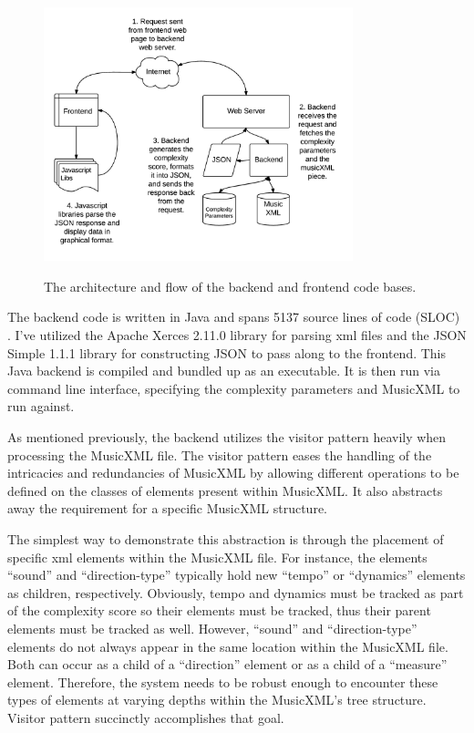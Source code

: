 \documentclass[12pt]{report}
\begin{document}
\begin{figure}[ht!]
	\centering
		\caption{The architecture and flow of the backend and frontend code bases.}
		\includegraphics[width=0.8\textwidth]{Architecture.png}
		\label{image:architecture}
\end{figure}

The backend code is written in Java \cite{java} and spans 5137 source lines of code (SLOC) \cite{nguyen2007sloc}. I've utilized the Apache Xerces 2.11.0 library for parsing xml files \cite{XMLAPI} and the JSON Simple 1.1.1 library \cite{JSONAPI} for constructing JSON \cite{crockford2006application} to pass along to the frontend. This Java backend is compiled and bundled up as an executable. It is then run via command line interface, specifying the complexity parameters and MusicXML to run against.

As mentioned previously, the backend utilizes the visitor pattern heavily when processing the MusicXML file. The visitor pattern eases the handling of the intricacies and redundancies of MusicXML by allowing different operations to be defined on the classes of elements present within MusicXML. It also abstracts away the requirement for a specific MusicXML structure.

The simplest way to demonstrate this abstraction is through the placement of specific xml elements within the MusicXML file. For instance, the elements ``sound'' and ``direction-type'' typically hold new ``tempo'' or ``dynamics'' elements as children, respectively. Obviously, tempo and dynamics must be tracked as part of the complexity score so their elements must be tracked, thus their parent elements must be tracked as well. However, ``sound'' and ``direction-type'' elements do not always appear in the same location within the MusicXML file. Both can occur as a child of a ``direction'' element or as a child of a ``measure'' element. Therefore, the system needs to be robust enough to encounter these types of elements at varying depths within the MusicXML's tree structure. Visitor pattern succinctly accomplishes that goal.
\end{document}

